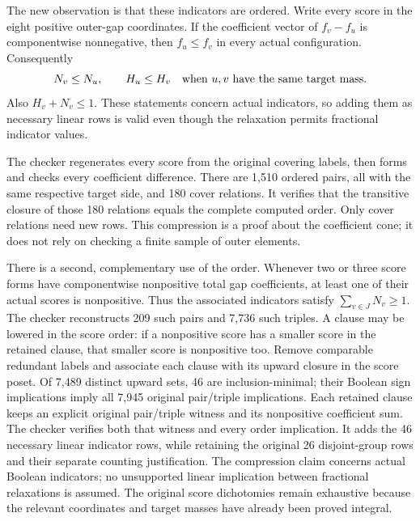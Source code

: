 \documentclass[11pt,a4paper]{article}
\begin{document}
The new observation is that these indicators are ordered.
Write every score in the eight positive outer-gap coordinates.
If the coefficient vector of $f_v-f_u$ is componentwise nonnegative,
then $f_u\le f_v$ in every actual configuration. Consequently
\begin{equation}\label{scoreorder}
 N_v\le N_u,\qquad
 H_u\le H_v\quad\hbox{when $u,v$ have the same target mass}.
\end{equation}
Also $H_v+N_v\le1$. These statements concern actual indicators,
so adding them as necessary linear rows is valid even though the
relaxation permits fractional indicator values.

The checker regenerates every score from the original covering labels,
then forms and checks every coefficient difference. There are 1,510
ordered pairs, all with the same respective target side, and 180 cover
relations. It verifies that the transitive closure of those 180 relations
equals the complete computed order. Only cover relations need new rows.
This compression is a proof about the coefficient cone; it does not rely
on checking a finite sample of outer elements.

There is a second, complementary use of the order. Whenever two or three
score forms have componentwise nonpositive total gap coefficients,
at least one of their actual scores is nonpositive. Thus the associated
indicators satisfy $\sum_{v\in J}N_v\ge1$.
The checker reconstructs 209 such pairs and 7,736 such triples.
A clause may be lowered in the score order: if a nonpositive score has
a smaller score in the retained clause, that smaller score is nonpositive
too. Remove comparable redundant labels and associate each clause with
its upward closure in the score poset. Of 7,489 distinct upward sets,
46 are inclusion-minimal; their Boolean sign implications imply all
7,945 original pair/triple implications. Each retained clause keeps an
explicit original pair/triple witness and its nonpositive coefficient
sum. The checker verifies both that witness and every order implication.
It adds the 46 necessary linear indicator rows, while retaining the
original 26 disjoint-group rows and their separate counting justification.
The compression claim concerns actual Boolean indicators; no unsupported
linear implication between fractional relaxations is assumed.
The original score
dichotomies remain exhaustive because the relevant coordinates and
target masses have already been proved integral.
\end{document}

